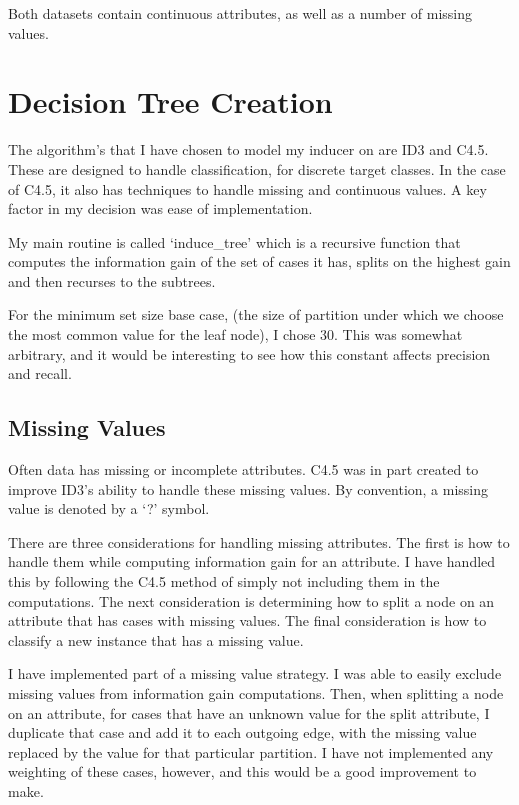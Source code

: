 \documentclass[letterpaper]{article}
\begin{document}
Both datasets contain continuous attributes, as well as a number of missing values.

\section{Decision Tree Creation}
The algorithm's that I have chosen to model my inducer on
are ID3 and C4.5. These are designed to handle classification, for
discrete target classes. In the case of C4.5, it also has techniques
to handle missing and continuous values. A key factor in my decision
was ease of implementation.

My main routine is called `induce_tree' which is a recursive function
that computes the information gain of the set of cases it has, splits
on the highest gain and then recurses to the subtrees.

For the minimum set size base case, (the size of partition under 
which we choose the most common value for the leaf node), I chose 30.
This was somewhat arbitrary, and it would be interesting to see how this constant
affects precision and recall.

\subsection{Missing Values}
Often data has missing or incomplete attributes. C4.5 was in part created to 
improve ID3's ability to handle these missing values. By convention,
a missing value is denoted by a `?' symbol.

There are three considerations for handling missing attributes. 
The first is how to handle them while computing information gain for 
an attribute. I have handled this by following the C4.5 method of simply 
not including them in the computations. The next consideration is determining 
how to split a node on an attribute that has cases with missing values. 
The final consideration is how to classify a new instance that 
has a missing value.

I have implemented part of a missing value strategy. I was able to
easily exclude missing values from information gain computations. 
Then, when splitting a node on an attribute, for cases that have an
unknown value for the split attribute, I duplicate that case and add
it to each outgoing edge, with the missing value replaced by the
value for that particular partition. I have not implemented any
weighting of these cases, however, and this would be a good improvement
to make.
\end{document}
